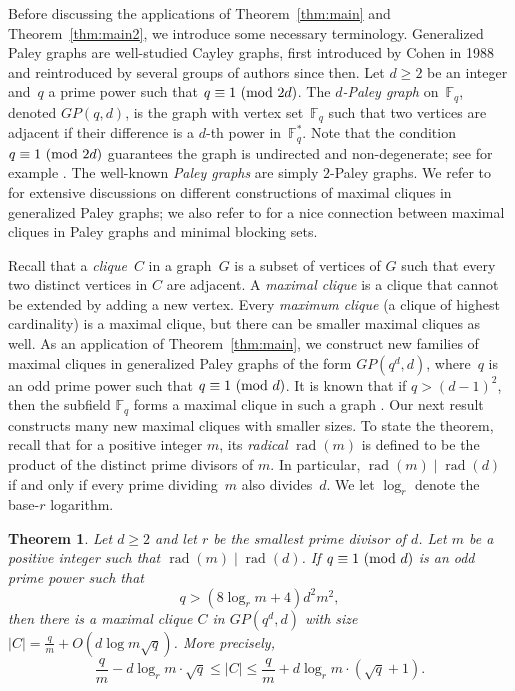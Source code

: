 \documentclass[12pt,reqno]{amsart}
\newtheorem{thm}{Theorem}[section]
\theoremstyle{definition}
\newcommand{\F}{\mathbb{F}}
\newcommand{\rad}{\operatorname{rad}}
\renewcommand{\pmod}[1]{{\ifmmode\text{\rm\ (mod~$#1$)}\else\discretionary{}{}{\hbox{ }}\rm(mod~$#1$)\fi}}
\begin{document}
Before discussing the applications of Theorem~\ref{thm:main} and Theorem~\ref{thm:main2}, we introduce some necessary terminology. Generalized Paley graphs are well-studied Cayley graphs, first introduced by Cohen \cite{SC} in 1988 and reintroduced by several groups of authors since then. Let $d\ge2$ be an integer and~$q$ a prime power such that $q \equiv 1 \pmod {2d}$. The {\em $d$-Paley graph} on~$\F_q$, denoted $GP(q,d)$, is the graph with vertex set~$\F_q$ such that two vertices are adjacent if their difference is a $d$-th power in~$\F_q^*$. Note that the condition $q \equiv 1 \pmod {2d}$ guarantees the graph is undirected and non-degenerate; see for example \cite[Section 4]{SC}. The well-known {\em Paley graphs} are simply $2$-Paley graphs. We refer to \cite{BEHW96, GKSV18, GMS22, GSY23, Y22, Y23} for extensive discussions on different constructions of maximal cliques in generalized Paley graphs; we also refer to \cite[Proposition 2]{S92} for a nice connection between maximal cliques in Paley graphs and minimal blocking sets.

Recall that a {\em clique}~$C$ in a graph~$G$ is a subset of vertices of $G$ such that every two distinct vertices in $C$ are adjacent. A {\em maximal clique} is a clique that cannot be extended by adding a new vertex. Every {\em maximum clique} (a clique of highest cardinality) is a maximal clique, but there can be smaller maximal cliques as well. As an application of Theorem~\ref{thm:main}, we construct new families of maximal cliques in generalized Paley graphs of the form $GP(q^d,d)$, where~$q$ is an odd prime power such that $q \equiv 1 \pmod d$. It is known that if $q>(d-1)^2$, then the subfield $\F_q$ forms a maximal clique in such a graph \cite[Theorem 1.2]{Y23}. Our next result constructs many new maximal cliques with smaller sizes. To state the theorem, recall that for a positive integer $m$, its \emph{radical} $\rad(m)$ is defined to be the product of the distinct prime divisors of $m$. In particular, $\rad(m)\mid\rad(d)$ if and only if every prime dividing~$m$ also divides~$d$. We let $\log_r$ denote the base-$r$ logarithm.

\begin{thm}\label{thm:newmaxclique}
Let $d \geq 2$ and let $r$ be the smallest prime divisor of $d$. Let $m$ be a positive integer such that $\rad(m) \mid \rad(d)$. If $q \equiv 1 \pmod d$ is an odd prime power such that
$$
q>(8\log_r m+4)d^2m^2,
$$
then there is a maximal clique $C$ in $GP(q^d,d)$ with size $|C|=\frac{q}{m}+O(d\log m\sqrt{q})$. More precisely,
$$
\frac{q}{m}-d\log_r m \cdot \sqrt{q}\leq |C|\leq \frac{q}{m}+d\log_r m \cdot (\sqrt{q}+1).
$$    
\end{thm}
\end{document}

